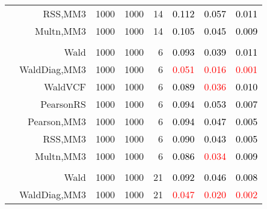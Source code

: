 \documentclass[
]{article}
\begin{document}
\begin{table}[H]
{\begin{tabular}[t]{lrrrrrrr}
\hspace{1em} & RSS,MM3 & 1000 & 1000 & 14 & \textcolor{black}{0.112} & \textcolor{black}{0.057} & \textcolor{black}{0.011}\\

\hspace{1em} & Multn,MM3 & 1000 & 1000 & 14 & \textcolor{black}{0.105} & \textcolor{black}{0.045} & \textcolor{black}{0.009}\\
\cmidrule{1-8}
\addlinespace[0.3em]
\multicolumn{8}{l}{\textbf{2F 10V}}\\
\hspace{1em} & Wald & 1000 & 1000 & 6 & \textcolor{black}{0.093} & \textcolor{black}{0.039} & \textcolor{black}{0.011}\\

\hspace{1em} & WaldDiag,MM3 & 1000 & 1000 & 6 & \textcolor{red}{0.051} & \textcolor{red}{0.016} & \textcolor{red}{0.001}\\

\hspace{1em} & WaldVCF & 1000 & 1000 & 6 & \textcolor{black}{0.089} & \textcolor{red}{0.036} & \textcolor{black}{0.010}\\

\hspace{1em} & PearsonRS & 1000 & 1000 & 6 & \textcolor{black}{0.094} & \textcolor{black}{0.053} & \textcolor{black}{0.007}\\

\hspace{1em} & Pearson,MM3 & 1000 & 1000 & 6 & \textcolor{black}{0.094} & \textcolor{black}{0.047} & \textcolor{black}{0.005}\\

\hspace{1em} & RSS,MM3 & 1000 & 1000 & 6 & \textcolor{black}{0.090} & \textcolor{black}{0.043} & \textcolor{black}{0.005}\\

\hspace{1em} & Multn,MM3 & 1000 & 1000 & 6 & \textcolor{black}{0.086} & \textcolor{red}{0.034} & \textcolor{black}{0.009}\\
\cmidrule{1-8}
\addlinespace[0.3em]
\multicolumn{8}{l}{\textbf{3F 15V}}\\
\hspace{1em} & Wald & 1000 & 1000 & 21 & \textcolor{black}{0.092} & \textcolor{black}{0.046} & \textcolor{black}{0.008}\\

\hspace{1em} & WaldDiag,MM3 & 1000 & 1000 & 21 & \textcolor{red}{0.047} & \textcolor{red}{0.020} & \textcolor{red}{0.002}\\


\end{tabular}}
\end{table}
\end{document}
